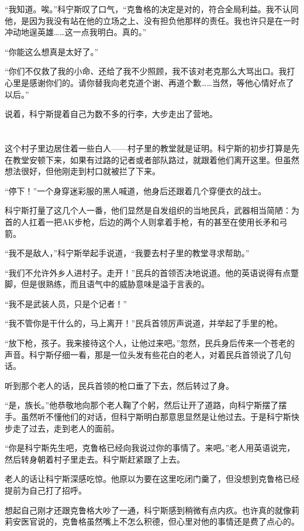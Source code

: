 “我知道。唉。”科宁斯叹了口气，“克鲁格的决定是对的，符合全局利益。我不认同他，是因为我没有站在他的立场之上、没有担负他那样的责任。我也许只是在一时冲动地逞英雄……这一点我明白。真的。”

“你能这么想真是太好了。”

“你们不仅救了我的小命、还给了我不少照顾，我不该对老克那么大骂出口。我打心里是感谢你们的。请你替我向老克道个谢、再道个歉……当然，等他心情好点了以后。”

说着，科宁斯提着自己为数不多的行李，大步走出了营地。

\section*{}

这个村子里边居住着一些白人——村子里的教堂就是证明。科宁斯的初步打算是先在教堂安顿下来，如果有过路的记者或者部队路过，就跟着他们离开这里。但虽然想法很好，但他刚走到村口就被拦了下来。

“停下！”一个身穿迷彩服的黑人喊道，他身后还跟着几个穿便衣的战士。

科宁斯打量了这几个人一番，他们显然是自发组织的当地民兵，武器相当简陋：为首的人扛着一把AK步枪，后边的两个人则拿着手枪，有的甚至在使用长矛和弓箭。

“我不是敌人，”科宁斯举起手说道，“我要去村子里的教堂寻求帮助。”

“我们不允许外乡人进村子。走开！”民兵的首领否决地说道。他的英语说得有点蹩脚，但是很熟练，而且语气中的威胁意味是溢于言表的。

“我不是武装人员，只是个记者！”

“我不管你是干什么的，马上离开！”民兵首领厉声说道，并举起了手里的枪。

“放下枪，孩子。我来接待这个人，让他过来吧。”忽然，民兵身后传来一个苍老的声音。科宁斯仔细一看，那是一位头发有些花白的老人，对着民兵首领说了几句话。

听到那个老人的话，民兵首领的枪口垂了下去，然后转过了身。

“是，族长。”他恭敬地向那个老人鞠了个躬，然后让开了道路，向科宁斯摆了摆手。虽然听不懂他们的对话，但科宁斯明白那意思显然是让他过去。于是科宁斯快步走了过去，走到老人的面前。

“你是科宁斯先生吧，克鲁格已经向我说过你的事情了。来吧。”老人用英语说完，然后转身朝着村子里走去。科宁斯赶紧跟了上去。

老人的话让科宁斯深感吃惊。他原以为要在这里吃闭门羹了，但没想到克鲁格已经提前为自己打了招呼。

想起自己刚才还跟克鲁格大吵了一通，科宁斯感到稍微有点内疚。也许真的就像莉莉安医官说的，克鲁格虽然嘴上不怎么积德，但心里对他的事情还是费了点心的。

